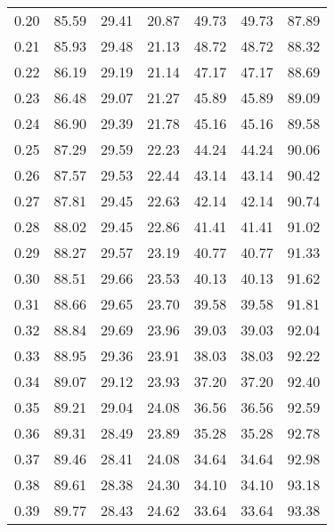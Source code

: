 \begin{tabular}{|c|c|c|c|c|c|c|}
      0.20 &     85.59 &     29.41 &      20.87 &   49.73 &      49.73 &         87.89 \\
      0.21 &     85.93 &     29.48 &      21.13 &   48.72 &      48.72 &         88.32 \\
      0.22 &     86.19 &     29.19 &      21.14 &   47.17 &      47.17 &         88.69 \\
      0.23 &     86.48 &     29.07 &      21.27 &   45.89 &      45.89 &         89.09 \\
      0.24 &     86.90 &     29.39 &      21.78 &   45.16 &      45.16 &         89.58 \\
      0.25 &     87.29 &     29.59 &      22.23 &   44.24 &      44.24 &         90.06 \\
      0.26 &     87.57 &     29.53 &      22.44 &   43.14 &      43.14 &         90.42 \\
      0.27 &     87.81 &     29.45 &      22.63 &   42.14 &      42.14 &         90.74 \\
      0.28 &     88.02 &     29.45 &      22.86 &   41.41 &      41.41 &         91.02 \\
      0.29 &     88.27 &     29.57 &      23.19 &   40.77 &      40.77 &         91.33 \\
      0.30 &     88.51 &     29.66 &      23.53 &   40.13 &      40.13 &         91.62 \\
      0.31 &     88.66 &     29.65 &      23.70 &   39.58 &      39.58 &         91.81 \\
      0.32 &     88.84 &     29.69 &      23.96 &   39.03 &      39.03 &         92.04 \\
      0.33 &     88.95 &     29.36 &      23.91 &   38.03 &      38.03 &         92.22 \\
      0.34 &     89.07 &     29.12 &      23.93 &   37.20 &      37.20 &         92.40 \\
      0.35 &     89.21 &     29.04 &      24.08 &   36.56 &      36.56 &         92.59 \\
      0.36 &     89.31 &     28.49 &      23.89 &   35.28 &      35.28 &         92.78 \\
      0.37 &     89.46 &     28.41 &      24.08 &   34.64 &      34.64 &         92.98 \\
      0.38 &     89.61 &     28.38 &      24.30 &   34.10 &      34.10 &         93.18 \\
      0.39 &     89.77 &     28.43 &      24.62 &   33.64 &      33.64 &         93.38 \\

\end{tabular}
